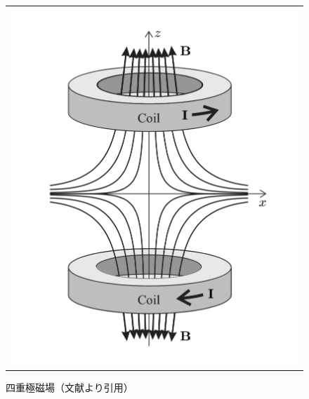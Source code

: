 \documentclass[uplatex, dvipdfmx, a4paper, report, papersize, 11pt]{jsbook}
\begin{document}
\begin{figure}[htpb]
\begin{tabular}{c}
      \begin{minipage}{0.50\hsize}
        \centering
          \includegraphics[keepaspectratio,  scale=0.50,  angle=0]
                          {figures/chapter2/MOT_magnetic_field.png}
                          \caption{四重極磁場（文献\cite{Foot:1080846}より引用）}
                          \label{MOT_magnetic_field}
      \end{minipage} \\



\end{tabular}
\end{figure}
\end{document}
